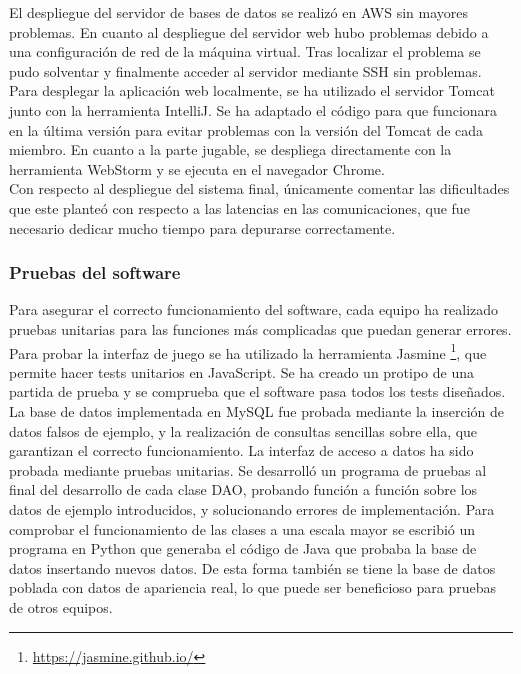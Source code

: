 El despliegue del servidor de bases de datos se realizó en AWS sin mayores problemas. En cuanto al despliegue del servidor web hubo problemas debido a una configuración de red de la máquina virtual. Tras localizar el problema se pudo solventar y finalmente acceder al servidor mediante SSH sin problemas.\\

Para desplegar la aplicación web localmente, se ha utilizado el servidor Tomcat junto con la herramienta IntelliJ. Se ha adaptado el código para que funcionara en la última versión para evitar problemas con la versión del Tomcat de cada miembro. En cuanto a la parte jugable, se despliega directamente con la herramienta WebStorm y se ejecuta en el navegador Chrome.\\

Con respecto al despliegue del sistema final, únicamente comentar las dificultades que este planteó con respecto a las latencias en las comunicaciones, que fue necesario dedicar mucho tiempo para depurarse correctamente.

\subsubsection{Pruebas del software}
Para asegurar el correcto funcionamiento del software, cada equipo ha realizado pruebas unitarias para las funciones más complicadas que puedan generar errores.\\

Para probar la interfaz de juego se ha utilizado la herramienta Jasmine \footnote{ \url{https://jasmine.github.io/} }, que permite hacer tests unitarios en JavaScript. Se ha creado un protipo de una partida de prueba y se comprueba que el software pasa todos los tests diseñados.\\

La base de datos implementada en MySQL fue probada mediante la inserción de datos falsos de ejemplo, y la realización de consultas sencillas sobre ella, que garantizan el correcto funcionamiento. La interfaz de acceso a datos ha sido probada mediante pruebas unitarias. Se desarrolló un programa de pruebas al final del desarrollo de cada clase DAO, probando función a función sobre los datos de ejemplo introducidos, y solucionando errores de implementación. Para comprobar el funcionamiento de las clases a una escala mayor se escribió un programa en Python que generaba el código de Java que probaba la base de datos insertando nuevos datos. De esta forma también se tiene la base de datos poblada con datos de apariencia real, lo que puede ser beneficioso para pruebas de otros equipos.\\


